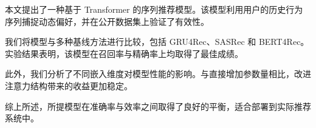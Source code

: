 本文提出了一种基于 Transformer 的序列推荐模型。该模型利用用户的历史行为序列捕捉动态偏好，并在公开数据集上验证了有效性。

我们将模型与多种基线方法进行比较，包括 GRU4Rec、SASRec 和 BERT4Rec。实验结果表明，该模型在召回率与精确率上均取得了最佳成绩。

此外，我们分析了不同嵌入维度对模型性能的影响。与直接增加参数量相比，改进注意力结构带来的收益更加稳定。

综上所述，所提模型在准确率与效率之间取得了良好的平衡，适合部署到实际推荐系统中。
